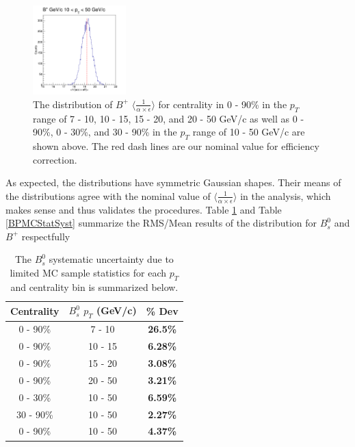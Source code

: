 \begin{figure}[h]
\begin{center}
\includegraphics[width= 0.32\textwidth]{Figures/Chapter5/BPStatSyst_0_90_1BinsPT.png}
\caption{The distribution of $B^+$ $\langle \frac{1}{\alpha \times \epsilon} \rangle$ for centrality in 0 - 90\% in the $p_T$ range of 7 - 10, 10 - 15, 15 - 20, and 20 - 50 GeV/c as well as 0 - 90\%, 0 - 30\%, and 30 - 90\% in the $p_T$ range of 10 - 50 GeV/c are shown above. The red dash lines are our nominal value for efficiency correction.}
\label{BPEffStatSyst}
\end{center}
\end{figure}


As expected, the distributions have symmetric Gaussian shapes. Their means of the distributions agree with the nominal value of $\langle\frac{1}{\alpha \times \epsilon}\rangle$ in the analysis, which makes sense and thus validates the procedures. Table \ref{BsMCStatSyst} and Table \ref{BPMCStatSyst} summarize the RMS/Mean results of the distribution for $B^0_s$ and $B^+$ respectfully 

\begin{table}[h]
\begin{center}
\caption{The $B^0_s$ systematic uncertainty due to limited MC sample statistics for each $p_T$ and centrality bin is summarized below.}
\vspace{1em}
\label{BsMCStatSyst}
  \begin{tabular}{| c | c |c |}
    \hline
     Centrality & $B^0_s$ $p_T$ (GeV/c) & \% Dev \\
    \hline
    \hline
0 - 90\% & 7 - 10 &   \textbf{26.5\% }     \\ 
0 - 90\% & 10 - 15 & \textbf{6.28\% }    \\ 
0 - 90\% & 15 - 20 &  \textbf{3.08\% }     \\ 
0 - 90\% & 20 - 50 &  \textbf{3.21\% }    \\ 
0 - 30\% & 10 - 50 &   \textbf{6.59\% }  \\ 
30 - 90\% & 10 - 50 & \textbf{2.27\% }    \\ 
0 - 90\% & 10 - 50 &  \textbf{4.37\% }   \\ 
    \hline
    \hline
\end{tabular}
\end{center}
\end{table}




